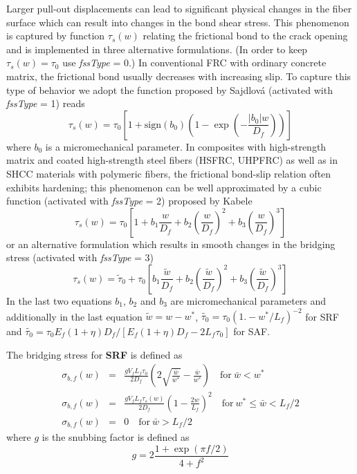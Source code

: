 \documentclass[a4paper]{article}
\newcommand{\param}[1]{{\it #1}}
\begin{document}
Larger pull-out displacements can lead to significant physical changes in the fiber surface which can result into changes in the bond shear stress. This phenomenon is captured by function $\tau_s(w)$ relating the frictional bond to the crack opening and is implemented in three alternative formulations. (In order to keep $\tau_s(w) = \tau_0$ use \param{fssType} = 0.) In conventional FRC with ordinary concrete matrix, the frictional bond usually decreases with increasing slip. To capture this type of behavior we adopt the function proposed by Sajdlov\'{a} (activated with \param{fssType} = 1) reads
%
\begin{equation}
\tau_s(w) = \tau_0 \left[ 1 + \mathrm{sign}(b_0) \left( 1 - \exp \left( -\frac{|b_0| w}{D_f}  \right) \right)  \right]
\end{equation}
where $b_0$ is a micromechanical parameter.
%
In composites with high-strength matrix and coated high-strength steel fibers (HSFRC, UHPFRC) as well as in SHCC materials with polymeric fibers, the frictional bond-slip relation often exhibits hardening; this phenomenon can be well approximated by a cubic function (activated with \param{fssType} = 2) proposed by Kabele 
%
\begin{equation}
\tau_s(w) = \tau_0 \left[ 1 + b_1 \frac{w}{D_f} + b_2 \left( \frac{w}{D_f} \right)^2 + b_3 \left( \frac{w}{D_f} \right)^3 \right]
\end{equation}
%
or an alternative formulation which results in smooth changes in the bridging stress (activated with \param{fssType} = 3)
%
\begin{equation}
\tau_s(w) = \tilde{\tau}_0 + \tau_0 \left[ b_1 \frac{ \tilde{w} }{D_f} + b_2 \left( \frac{ \tilde{w} }{D_f} \right)^2 + b_3 \left( \frac{ \tilde{w} }{D_f} \right)^3 \right]
\end{equation}
%
In the last two equations $b_1$, $b_2$ and $b_3$ are micromechanical parameters and additionally in the last equation $\tilde{w} = w - w^{\ast}$, $\tilde{\tau_0} = \tau_0 (1.-w^{\ast}/L_f)^{-2}$ for SRF and $\tilde{\tau_0} = \tau_0 E_f (1+\eta) D_f / [ E_f (1+\eta) D_f - 2 L_f \tau_0 ]$ for SAF.

The bridging stress for \textbf{SRF} is defined as 
%
\begin{eqnarray}
\sigma_{b,f}(w) &=& \frac{g V_f L_f \tau_0}{2 D_f} \left( 2 \sqrt{ \frac{\bar{w} }{w^{\ast}} } - \frac{\bar{w}}{ w^{\ast} } \right) \quad \mathrm{for} \: \bar{w} < w^* \\
\sigma_{b,f}(w) &=& \frac{g V_f L_f \tau_s(w)}{2 D_f} \left( 1- \frac{2 w}{L_f} \right)^2 \quad \mathrm{for} \: w^* \leq \bar{w} < L_f/2 \\
\sigma_{b,f}(w) &=& 0 \quad \mathrm{for} \: \bar{w} > L_f/2 
\end{eqnarray}
%
where $g$ is the snubbing factor is defined as 
\begin{equation}
g = 2 \frac{ 1 + \exp(\pi f / 2) }{ 4 + f^2}
\end{equation}
\end{document}
